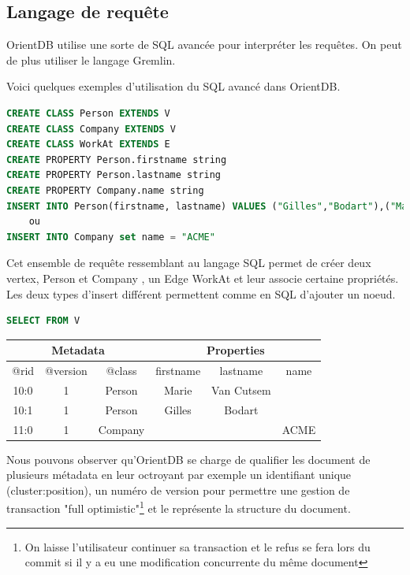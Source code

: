 \documentclass[a4paper,fleqn,12pt]{report}
\begin{document}
\subsection{Langage de requête}

OrientDB utilise une sorte de SQL avancée pour interpréter les requêtes. On peut de plus utiliser le langage Gremlin.

Voici quelques exemples d'utilisation du SQL avancé dans OrientDB.

\begin{lstlisting}[language=SQL]
CREATE CLASS Person EXTENDS V
CREATE CLASS Company EXTENDS V
CREATE CLASS WorkAt EXTENDS E
CREATE PROPERTY Person.firstname string
CREATE PROPERTY Person.lastname string
CREATE PROPERTY Company.name string
INSERT INTO Person(firstname, lastname) VALUES ("Gilles","Bodart"),("Marie","Van Cutsem")
	ou
INSERT INTO Company set name = "ACME"

\end{lstlisting}

Cet ensemble de requête ressemblant au langage SQL permet de créer deux vertex, Person et Company , un Edge WorkAt et leur associe certaine propriétés. Les deux types d'insert différent permettent comme en SQL d'ajouter un noeud.  

\begin{lstlisting}[language=SQL]
SELECT FROM V
\end{lstlisting}
\begin{center}
	\begin{tabular}{|c|c|c|c|c|c|}
   		\hline
  		\multicolumn{3}{|c|}{Metadata} & \multicolumn{3}{c|}{Properties} \\
   		\hline
   		@rid & @version & @class & firstname & lastname & name \\
   		\hline
   		10:0 & 1 & Person & Marie & Van Cutsem &  \\
   		10:1 & 1 & Person & Gilles & Bodart &  \\
   		11:0 & 1 & Company &  &  & ACME \\
   		\hline
	\end{tabular}
\end{center}

Nous pouvons observer qu'OrientDB se charge de qualifier les document de plusieurs métadata en leur octroyant par exemple un identifiant unique (\no cluster:position), un numéro de version pour permettre une gestion de transaction "full optimistic"\footnote{On laisse l'utilisateur continuer sa transaction et le refus se fera lors du commit si il y a eu une modification concurrente du même document} et le \@class représente la structure du document.
\end{document}
